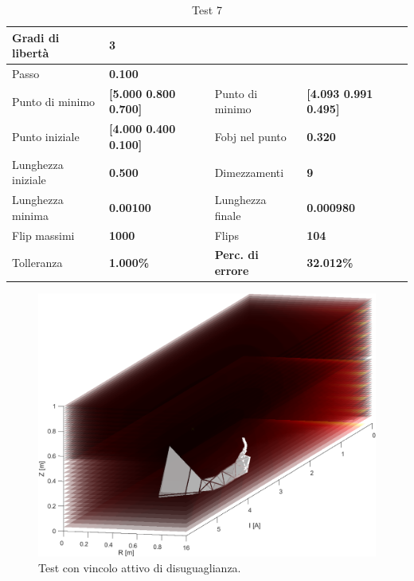 \documentclass[a4paper, 11pt]{article}
\begin{document}
\begin{table}[h]
	\caption{Test 7}
	\begin{center}
	\begin{tabular}{|l|l|l|l|} 
	\hline 
	Gradi di libertà & \textbf{3} &  &  \\ \hline 
	Passo & \textbf{0.100} &  &  \\ \hline 
	Punto di minimo & \textbf{{[}5.000 0.800 0.700{]}} & Punto di minimo & \textbf{{[}4.093 0.991 0.495{]}} \\ \hline 
	Punto iniziale & \textbf{{[}4.000 0.400 0.100{]}} & Fobj nel punto & \textbf{0.320} \\ \hline 
	Lunghezza iniziale & \textbf{0.500} & Dimezzamenti & \textbf{9} \\ \hline 
	Lunghezza minima & \textbf{0.00100} & Lunghezza finale & \textbf{0.000980} \\ \hline
	Flip massimi & \textbf{1000} & Flips & \textbf{104} \\ \hline 
	Tolleranza & \textbf{1.000\%} & \textbf{Perc. di errore} & \textbf{32.012\%} \\ \hline 
	\end{tabular} 
	\end{center}
	\end{table}

\begin{figure}[H]
	\centering
		\includegraphics[width=14cm]{assets/figure7}
		\caption{Test con vincolo attivo di disuguaglianza.}
\end{figure}
\noindent
\end{document}
